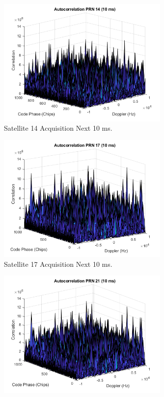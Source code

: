 \documentclass[11pt]{article}
\begin{document}
\begin{enumerate}[label=\textbf{\arabic*.}]
\begin{figure}[H]
        \includegraphics[width=0.75\textwidth]{Lab_4_PRN14_10ms.png}
        \caption{Satellite 14 Acquisition Next 10 ms.}
    \end{figure}
    \begin{figure}[H]
        \centering
        \includegraphics[width=0.75\textwidth]{Lab_4_PRN17_10ms.png}
        \caption{Satellite 17 Acquisition Next 10 ms.}
    \end{figure}
    \begin{figure}[H]
        \centering
        \includegraphics[width=0.75\textwidth]{Lab_4_PRN21_10ms.png}

\end{figure}
\end{enumerate}
\end{document}
